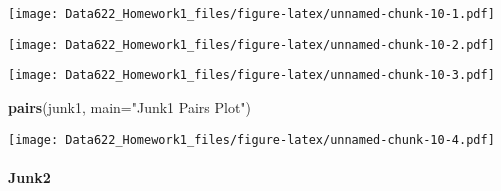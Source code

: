 \documentclass[]{article}
\newenvironment{Shaded}{\begin{snugshade}}{\end{snugshade}}
\newcommand{\KeywordTok}[1]{\textcolor[rgb]{0.13,0.29,0.53}{\textbf{#1}}}
\newcommand{\DataTypeTok}[1]{\textcolor[rgb]{0.13,0.29,0.53}{#1}}
\newcommand{\DecValTok}[1]{\textcolor[rgb]{0.00,0.00,0.81}{#1}}
\newcommand{\StringTok}[1]{\textcolor[rgb]{0.31,0.60,0.02}{#1}}
\newcommand{\OperatorTok}[1]{\textcolor[rgb]{0.81,0.36,0.00}{\textbf{#1}}}
\newcommand{\NormalTok}[1]{#1}
\let\oldparagraph\paragraph
\renewcommand{\paragraph}[1]{\oldparagraph{#1}\mbox{}}
\begin{document}
\texttt{[image: Data622\_Homework1\_files/figure-latex/unnamed-chunk-10-1.pdf]}

\begin{Shaded}
\end{Shaded}

\texttt{[image: Data622\_Homework1\_files/figure-latex/unnamed-chunk-10-2.pdf]}

\begin{Shaded}
\end{Shaded}

\texttt{[image: Data622\_Homework1\_files/figure-latex/unnamed-chunk-10-3.pdf]}

\begin{Shaded}
\begin{Highlighting}[]
\KeywordTok{pairs}\NormalTok{(junk1, }\DataTypeTok{main=}\StringTok{"Junk1 Pairs Plot"}\NormalTok{)}
\end{Highlighting}
\end{Shaded}

\texttt{[image: Data622\_Homework1\_files/figure-latex/unnamed-chunk-10-4.pdf]}

\paragraph{Junk2}\label{junk2}
\end{document}

